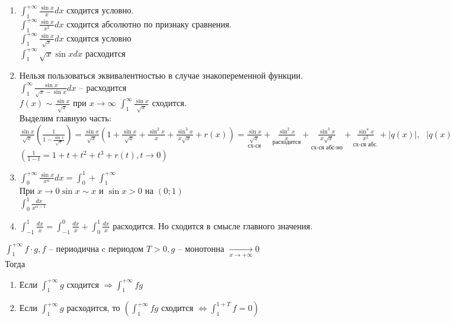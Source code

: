 \begin{Example}
\begin{enumerate}
		\item $\displaystyle \int_{1}^{+\infty} \frac{\sin x}{x} dx$ сходится условно.\\
		$\displaystyle \int_{1}^{+\infty} \frac{\sin x}{x^2} dx$ сходится абсолютно по признаку сравнения.\\ 
		$\displaystyle \int_{1}^{+\infty} \frac{\sin x}{\sqrt{x}} dx$ сходится условно\\
		$\displaystyle \int_{1}^{+\infty} \sqrt{x} \sin x dx$ расходится	
		\item Нельзя пользоваться эквивалентностью в случае знакопеременной функции.\\
		$\displaystyle \int_{1}^{\infty} \frac{\sin x}{\sqrt{x} - \sin x} dx$ -- расходится\\
		$\displaystyle f(x) \sim \frac{\sin x}{\sqrt{x}}$ при $\displaystyle x \to \infty$ 
		$\displaystyle\int_{1}^{\infty} \frac{\sin x}{\sqrt{x}} $ сходится.\\ 
		Выделим главную часть: $\displaystyle \frac{\sin x}{\sqrt{x}} \left( \frac{1}{1 - \frac{\sin x}{\sqrt{x}}}  \right) = 
		\frac{\sin x}{\sqrt{x}} (1 + \frac{\sin x}{\sqrt{x}} + \frac{\sin^2 x}{x} + \frac{\sin^3 x}{x\sqrt{x}} + r(x)) =
		\underset{\text{сх-ся}}{\frac{\sin x}{\sqrt{x}}} + \underset{\text{расходится}}{\frac{\sin^2 x}{x}} +
		\underset{\text{сх-ся абс-но}}{\frac{\sin^3 x}{x\sqrt{x}}} + \underset{\text{сх-ся абс.}}{\frac{\sin^4 x}{x^2}} + |q(x)|, \ \ \ |q(x)| \leqslant \frac{c}{x^2}$\\
		$\displaystyle \left(\frac{1}{1-t} = 1 + t + t^2 + t^3 + r(t), t \to 0\right)$
		\item $\displaystyle \int_{0}^{+\infty} \frac{\sin x}{x^{\alpha}}dx = \int_{0}^{1} + \int_{1}^{+\infty} $\\
		При $x \to 0 \sin x \sim x$  и $\sin x > 0$ на $(0;1)$\\
		$\displaystyle \int_{0}^{1} \frac{dx}{x^{\alpha -1}}$
		\item $\displaystyle \int_{-1}^{1} \frac{dx}{x} = \int_{-1}^{0} \frac{dx}{x} + \int_{0}^{1} \frac{dx}{x}$ расходится.
		Но сходится в смысле главного значения.
	\end{enumerate}
\end{Example}

\begin{Rem}
	$\displaystyle \int_{1}^{+\infty} f \cdot g, f$ -- периодична c периодом $T > 0, g$ -- монотонна $\underset{x \to + \infty}{\to} 0$\\
	Тогда 
	\begin{enumerate}
		\item Если $\displaystyle \int_{1}^{+\infty} g$ сходится $\displaystyle \Rightarrow \int_{1}^{+\infty} fg$
		\item Если $\displaystyle \int_{1}^{+\infty} g$ расходится, то 
		$\displaystyle \left(\int_{1}^{+\infty} fg \text{ сходится } \Leftrightarrow \int_{1}^{1+T} f = 0 \right)$
	\end{enumerate}
\end{Rem}

